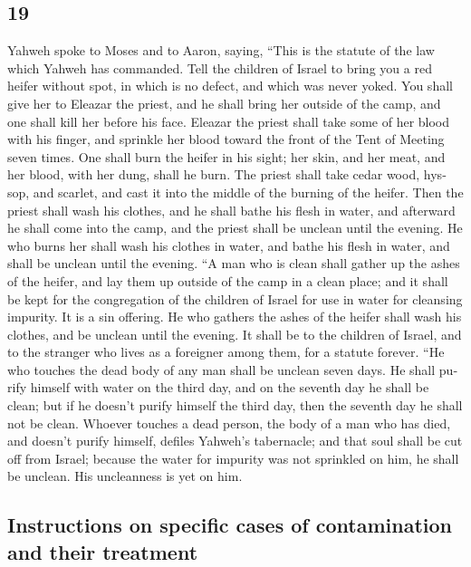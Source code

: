 \begin{paracol}{2}
\begin{otherlanguage}{english}
{\section{19}\label{section-37}}

 Yahweh spoke to Moses and to Aaron, saying,
 ``This is the statute of the law which Yahweh has
commanded. Tell the children of Israel to bring you a red heifer without
spot, in which is no defect, and which was never yoked. 
You shall give her to Eleazar the priest, and he shall bring her outside
of the camp, and one shall kill her before his face. 
Eleazar the priest shall take some of her blood with his finger, and
sprinkle her blood toward the front of the Tent of Meeting seven times.
 One shall burn the heifer in his sight; her skin, and her
meat, and her blood, with her dung, shall he burn.  The
priest shall take cedar wood, hyssop, and scarlet, and cast it into the
middle of the burning of the heifer.  Then the priest
shall wash his clothes, and he shall bathe his flesh in water, and
afterward he shall come into the camp, and the priest shall be unclean
until the evening.  He who burns her shall wash his
clothes in water, and bathe his flesh in water, and shall be unclean
until the evening.  ``A man who is clean shall gather up
the ashes of the heifer, and lay them up outside of the camp in a clean
place; and it shall be kept for the congregation of the children of
Israel for use in water for cleansing impurity. It is a sin offering.
 He who gathers the ashes of the heifer shall wash his
clothes, and be unclean until the evening. It shall be to the children
of Israel, and to the stranger who lives as a foreigner among them, for
a statute forever.  ``He who touches the dead body of any
man shall be unclean seven days.  He shall purify himself
with water on the third day, and on the seventh day he shall be clean;
but if he doesn't purify himself the third day, then the seventh day he
shall not be clean.  Whoever touches a dead person, the
body of a man who has died, and doesn't purify himself, defiles Yahweh's
tabernacle; and that soul shall be cut off from Israel; because the
water for impurity was not sprinkled on him, he shall be unclean. His
uncleanness is yet on him.

\hypertarget{instructions-on-specific-cases-of-contamination-and-their-treatment}{%
\subsection{Instructions on specific cases of contamination and their
treatment}\label{instructions-on-specific-cases-of-contamination-and-their-treatment}}


\end{otherlanguage}
\end{paracol}
